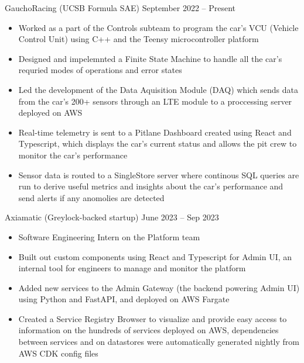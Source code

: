 \documentclass[9pt]{developercv} %
\begin{document}
\vspace{-18 pt}
\begin{entrylist}
    \entry
		{}
		{GauchoRacing (UCSB Formula SAE)}
		{September 2022 – Present}
		{\vspace{-10pt}
        \begin{itemize}[noitemsep,topsep=0pt,parsep=0pt,partopsep=0pt, leftmargin=10pt]
            \item Worked as a part of the Controls subteam to program the car's VCU (Vehicle Control Unit) using C++ and the Teensy microcontroller platform
            \item Designed and impelemnted a Finite State Machine to handle all the car's requried modes of operations and error states
            \item Led the development of the Data Aquisition Module (DAQ) which sends data from the car's 200+ sensors through an LTE module to a proccessing server deployed on AWS
            \item Real-time telemetry is sent to a Pitlane Dashboard created using React and Typescript, which displays the car's current status and allows the pit crew to monitor the car's performance
            \item Sensor data is routed to a SingleStore server where continous SQL queries are run to derive useful metrics and insights about the car's performance and send alerts if any anomolies are detected
        \end{itemize}}
	\entry
        {}
		{Axiamatic (Greylock-backed startup)}
		{June 2023 – Sep 2023}
		{\vspace{-10pt}
        \begin{itemize}[noitemsep,topsep=0pt,parsep=0pt,partopsep=0pt, leftmargin=10pt]
            \item Software Engineering Intern on the Platform team
            \item Built out custom components using React and Typescript for Admin UI, an internal tool for engineers to manage and monitor the platform
            \item Added new services to the Admin Gateway (the backend powering Admin UI) using Python and FastAPI, and deployed on AWS Fargate
            \item Created a Service Registry Browser to visualize and provide easy access to information on the hundreds of services deployed on AWS, dependencies between services and on datastores were automatically generated nightly from AWS CDK config files

\end{itemize}}
\end{entrylist}
\end{document}
